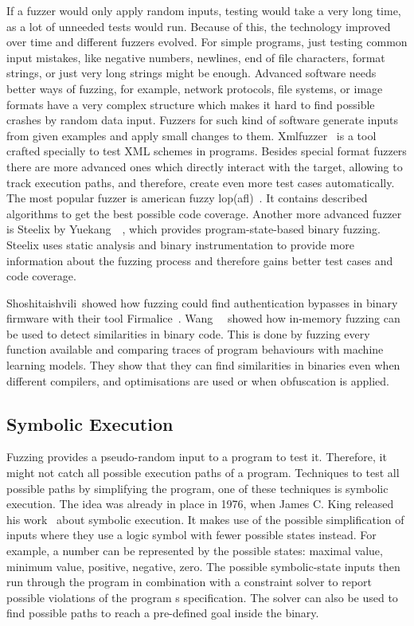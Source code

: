 If a fuzzer would only apply random inputs, testing would take a very long
time, as a lot of unneeded tests would run. Because of this, the technology
improved over time and different fuzzers evolved. For simple programs, just
testing common input mistakes, like negative numbers, newlines, end of file
characters, format strings, or just very long strings might be enough. Advanced
software needs better ways of fuzzing, for example, network protocols, file
systems, or image formats have a very complex structure which makes it hard to
find possible crashes by random data input. Fuzzers for such kind of software
generate inputs from given examples and apply small changes to them.
Xmlfuzzer~\cite{xmlfuzzer} is a tool crafted specially to test XML schemes in
programs. Besides special format fuzzers there are more advanced ones which
directly interact with the target, allowing to track execution paths, and
therefore, create even more test cases automatically. The most popular fuzzer is
\textquotedbl american fuzzy lop\textquotedbl (afl)~\cite{aflweb}. It contains
described algorithms to get the best possible code coverage. Another more
advanced fuzzer is Steelix by Yuekang~\etal~\cite{steelix}, which provides
program-state-based binary fuzzing. Steelix uses static analysis and binary
instrumentation to provide more information about the fuzzing process and
therefore gains better test cases and code coverage.

Shoshitaishvili~\etal showed how fuzzing could find authentication bypasses in
binary firmware with their tool Firmalice~\cite{firmalice}.
Wang~\etal~\cite{inmemfuzzing} showed how in-memory fuzzing can be used to detect
similarities in binary code. This is done by fuzzing every function available
and comparing traces of program behaviours with machine learning models. They
show that they can find similarities in binaries even when different compilers,
and optimisations are used or when obfuscation is applied.

\subsection{Symbolic Execution}

Fuzzing provides a pseudo-random input to a program to test it. Therefore, it
might not catch all possible execution paths of a program. Techniques to test
all possible paths by simplifying the program, one of these techniques is
symbolic execution. The idea was already in place in 1976, when James C. King
released his work~\cite{symbolexechist} about symbolic execution. It makes use
of the possible simplification of inputs where they use a logic symbol with
fewer possible states instead. For example, a number can be represented by the
possible states: maximal value, minimum value, positive, negative, zero. The
possible symbolic-state inputs then run through the program in combination with
a constraint solver to report possible violations of the program\textquotesingle
s specification. The solver can also be used to find possible paths to reach a
pre-defined goal inside the binary.

